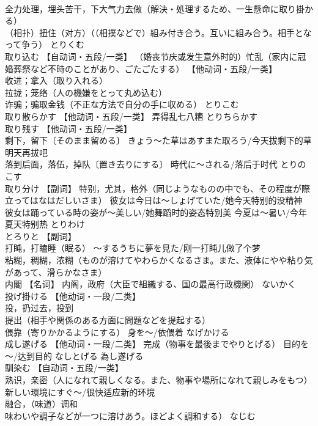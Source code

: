 \documentclass[8pt]{extreport}
\begin{document}
\begin{CJK}{UTF8}{min}
\\	全力处理，埋头苦干，下大气力去做（解決・処理するため、一生懸命に取り掛かる） 
\\	（相扑）扭住（对方）（（相撲などで）組み付き合う。互いに組み合う。相手となって争う）	とりくむ	
\\	取り込む	【自动词・五段/一类】 （婚丧节庆或发生意外时的）忙乱（家内に冠婚葬祭など不時のことがあり、ごたごたする） 【他动词・五段/一类】 
\\	收进；拿入（取り入れる） 
\\	拉拢；笼络（人の機嫌をとって丸め込む） 
\\	诈骗；骗取金钱（不正な方法で自分の手に収める）	とりこむ	
\\	取り散らかす	【他动词・五段/一类】 弄得乱七八糟	とりちらかす	
\\	取り残す	【他动词・五段/一类】 
\\	剩下，留下〔そのまま留める〕 きょう～た草はあすまた取ろう/今天拔剩下的草明天再拔吧 
\\	落到后面，落伍，掉队〔置き去りにする〕 時代に～される/落后于时代	とりのこす	
\\	取り分け	【副词】 特别，尤其，格外（同じようなものの中でも、その程度が際立ってはなはだしいさま） 彼女は今日は～しょげていた/她今天特别的没精神 彼女は踊っている時の姿が～美しい/她舞蹈时的姿态特别美 今夏は～暑い/今年夏天特别热	とりわけ	
\\	とろりと	【副词】 
\\	打盹，打瞌睡（眠る） ～するうちに夢を見た/刚一打盹儿做了个梦 
\\	粘糊，稠糊，浓糊（ものが溶けてやわらかくなるさま。また、液体にやや粘り気があって、滑らかなさま）		
\\	内閣	【名词】 内阁，政府（大臣で組織する、国の最高行政機関）	ないかく	
\\	投げ掛ける	【他动词・一段/二类】 
\\	投，扔过去，投到 
\\	提出（相手や関係のある方面に問題などを提起する） 
\\	偎靠（寄りかかるようにする） 身を～/依偎着	なげかける	
\\	成し遂げる	【他动词・一段/二类】 完成（物事を最後までやりとげる） 目的を～/达到目的	なしとげる	為し遂げる
\\	馴染む	【自动词・五段/一类】 
\\	熟识，亲密（人になれて親しくなる。また、物事や場所になれて親しみをもつ） 新しい環境にすぐ～/很快适应新的环境 
\\	融合，（味道）调和
\\	味わいや調子などが一つに溶けあう。ほどよく調和する）	なじむ	

\end{CJK}
\end{document}
